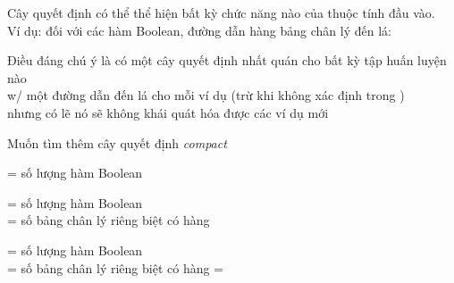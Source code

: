 \documentclass{article}
\begin{document}
\begin{huge}
Cây quyết định có thể thể hiện bất kỳ chức năng nào của thuộc tính đầu vào.\\
Ví dụ: đối với các hàm Boolean, đường dẫn hàng bảng chân lý \mat{$\rightarrow$} đến lá:

\vspace*{0.2in}

\textwidth
{}

Điều đáng chú ý là có một cây quyết định nhất quán cho bất kỳ tập huấn luyện nào\\
w/ một đường dẫn đến lá cho mỗi ví dụ (trừ khi  không xác định trong )\\
nhưng có lẽ nó sẽ không khái quát hóa được các ví dụ mới

Muốn tìm thêm cây quyết định \emph{compact}







= số lượng hàm Boolean



= số lượng hàm Boolean\\
= số bảng chân lý riêng biệt có hàng 



= số lượng hàm Boolean\\
= số bảng chân lý riêng biệt có  hàng = 



\end{huge}
\end{document}
